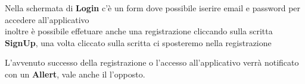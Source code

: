\documentclass[11pt]{article}
\begin{document}
	Nella schermata di \textbf{Login} c'è un form dove possibile iserire email e password per accedere all'applicativo \\
	inoltre è possibile effetuare anche una registrazione cliccando sulla scritta \textbf{SignUp}, una volta cliccato sulla scritta ci sposteremo nella registrazione
	\begin{figure}[h]
		\centering
		
	\end{figure}
	L'avvenuto successo della registrazione o l'accesso all'applicativo verrà notificato con un \textbf{Allert}, vale anche il l'opposto.
\end{document}

